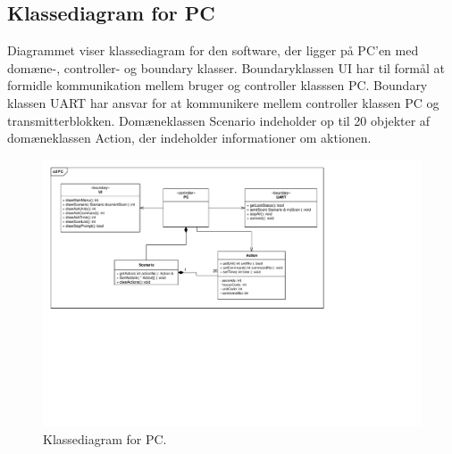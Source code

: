 \begin{landscape}

\subsection{Klassediagram for PC}
Diagrammet viser klassediagram for den software, der ligger på PC'en med domæne-, controller- og boundary klasser. Boundaryklassen UI har til formål at formidle kommunikation mellem bruger og controller klasssen PC. Boundary klassen UART har ansvar for at kommunikere mellem controller klassen PC og transmitterblokken. Domæneklassen Scenario indeholder op til 20 objekter af domæneklassen Action, der indeholder informationer om aktionen.

\begin{figure}[h]
	\centering %
	\includegraphics[height={\textwidth - 4.7 cm},trim=17 260 217 17, clip=true]{Systemarkitektur/Diagrammer/PC_Klassediagram.pdf}%
	\caption{Klassediagram for PC.}
	\label{fig:PC_klasse}
\end{figure}

\end{landscape}

